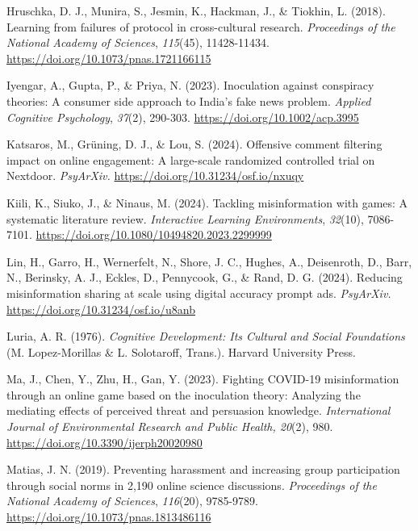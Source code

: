 \documentclass[authordate, reflection]{jote-new-article}
\begin{document}
	Hruschka, D. J., Munira, S., Jesmin, K., Hackman, J., \& Tiokhin, L. (2018). Learning from failures of protocol in cross-cultural research. \emph{Proceedings of the National Academy of Sciences}, \emph{115}(45), 11428-11434. \url{https://doi.org/10.1073/pnas.1721166115}



	Iyengar, A., Gupta, P., \& Priya, N. (2023). Inoculation against conspiracy theories: A consumer side approach to India's fake news problem. \emph{Applied Cognitive Psychology}, \emph{37}(2), 290-303. \url{https://doi.org/10.1002/acp.3995}



	Katsaros, M., Grüning, D. J., \& Lou, S. (2024). Offensive comment filtering impact on online engagement: A large-scale randomized controlled trial on Nextdoor. \emph{PsyArXiv.} \url{https://doi.org/10.31234/osf.io/nxuqy}



	Kiili, K., Siuko, J., \& Ninaus, M. (2024). Tackling misinformation with games: A systematic literature review. \emph{Interactive Learning Environments}, \emph{32}(10), 7086-7101. \url{https://doi.org/10.1080/10494820.2023.2299999}



	Lin, H., Garro, H., Wernerfelt, N., Shore, J. C., Hughes, A., Deisenroth, D., Barr, N., Berinsky, A. J., Eckles, D., Pennycook, G., \& Rand, D. G. (2024). Reducing misinformation sharing at scale using digital accuracy prompt ads. \emph{PsyArXiv.} \url{https://doi.org/10.31234/osf.io/u8anb}



	Luria, A. R. (1976). \emph{Cognitive Development: Its Cultural and Social Foundations }(M. Lopez-Morillas \& L. Solotaroff, Trans.). Harvard University Press.



	Ma, J., Chen, Y., Zhu, H., Gan, Y. (2023). Fighting COVID-19 misinformation through an online game based on the inoculation theory: Analyzing the mediating effects of perceived threat and persuasion knowledge. \emph{International Journal of Environmental Research and Public Health, 20}(2), 980. \url{https://doi.org/10.3390/ijerph20020980}



	Matias, J. N. (2019). Preventing harassment and increasing group participation through social norms in 2,190 online science discussions. \emph{Proceedings of the National Academy of Sciences}, \emph{116}(20), 9785-9789. \url{https://doi.org/10.1073/pnas.1813486116}
\end{document}
